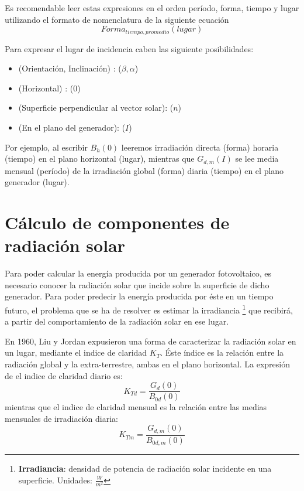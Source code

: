 Es recomendable leer estas expresiones en el orden período, forma, tiempo y lugar utilizando el formato de nomenclatura de la siguiente ecuación
\begin{equation}
	Forma_{tiempo, promedio}(lugar)
\end{equation}

Para expresar el lugar de incidencia caben las siguiente posibilidades:
\begin{itemize}
\item (Orientación, Inclinación) : ($\beta , \alpha$)
\item (Horizontal) : (0)
\item (Superficie perpendicular al vector solar): ($n$)
\item (En el plano del generador): ($I$)
\end{itemize}

Por ejemplo, al escribir $B_{h}(0)$ leeremos irradiación directa (forma) horaria (tiempo) en el plano horizontal (lugar), mientras que $G_{d,m}(I)$ se lee media mensual (período) de la irradiación global (forma) diaria (tiempo) en el plano generador (lugar).\\

\section{Cálculo de componentes de radiación solar}

Para poder calcular la energía producida por un generador fotovoltaico, es necesario conocer la radiación solar que incide sobre la superficie de dicho generador. Para poder predecir la energía producida por éste en un tiempo futuro, el problema que se ha de resolver es estimar la irradiancia \footnote{\textbf{Irradiancia}: densidad de potencia de radiación solar incidente en una superficie. Unidades: $\frac{W}{m^2}$} que recibirá, a partir del comportamiento de la radiación solar en ese lugar.

En 1960, Liu y Jordan \cite{lj60} expusieron una forma de caracterizar la radiación solar en un lugar, mediante el indice de claridad $K_T$. Éste índice es la relación entre la radiación global y la extra-terrestre, ambas en el plano horizontal. La expresión de el indice de claridad diario es:\\

\begin{equation}
K_{Td} = \frac{G_d(0)}{B_{0d}(0)}
\end{equation}
mientras que el indice de claridad mensual es la relación entre las medias mensuales de irradiación diaria:
\begin{equation}
K_{Tm} = \frac{G_{d,m}(0)}{B_{0d,m}(0)}
\end{equation}

